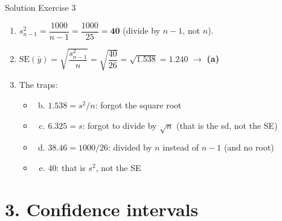\documentclass[
  11pt,
  ignorenonframetext,
  aspectratio=169,
]{beamer}
\providecommand{\tightlist}{%
  \setlength{\itemsep}{0pt}\setlength{\parskip}{0pt}}
\newcommand{\se}{\mathrm{SE}}
\begin{document}
\begin{frame}{Solution Exercise 3}
\protect{}\label{solution-exercise-3}
\begin{enumerate}
\item
  \(s^2_{n-1}=\dfrac{1000}{n-1}=\dfrac{1000}{25}=\mathbf{40}\) (divide
  by \(n-1\), not \(n\)).
\item
  \(\se(\bar y)=\sqrt{\dfrac{s^2_{n-1}}{n}}=\sqrt{\dfrac{40}{26}}=\sqrt{1.538}=\mathbf{1.240}\)
  \(\to\) \textbf{(a)}
\item
  The traps:

  \begin{itemize}
  \tightlist
  \item
    \begin{enumerate}
    [(a)]
    \setcounter{enumii}{1}
    \tightlist
    \item
      \(1.538=s^2/n\): forgot the square root
    \end{enumerate}
  \item
    \begin{enumerate}
    [(a)]
    \setcounter{enumii}{2}
    \tightlist
    \item
      \(6.325=s\): forgot to divide by \(\sqrt n\) (that is the sd, not
      the SE)
    \end{enumerate}
  \item
    \begin{enumerate}
    [(a)]
    \setcounter{enumii}{3}
    \tightlist
    \item
      \(38.46=1000/26\): divided by \(n\) instead of \(n-1\) (and no
      root)
    \end{enumerate}
  \item
    \begin{enumerate}
    [(a)]
    \setcounter{enumii}{4}
    \tightlist
    \item
      \(40\): that is \(s^2\), not the SE
    \end{enumerate}
  \end{itemize}
\end{enumerate}
\end{frame}

\section{3. Confidence intervals}\label{confidence-intervals}
\end{document}
